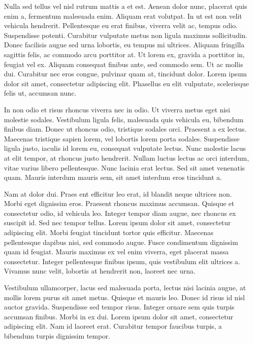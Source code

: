 \documentclass[
  12pt,
  a4paper,
]{book}
\begin{document}
Nulla sed tellus vel nisl rutrum mattis a et est. Aenean dolor nunc, placerat quis enim a, fermentum malesuada enim. Aliquam erat volutpat. In ut est non velit vehicula hendrerit. Pellentesque eu erat finibus, viverra velit ac, tempus odio. Suspendisse potenti. Curabitur vulputate metus non ligula maximus sollicitudin. Donec facilisis augue sed urna lobortis, eu tempus mi ultrices. Aliquam fringilla sagittis felis, ac commodo arcu porttitor at. Ut lorem ex, gravida a porttitor in, feugiat vel ex. Aliquam consequat finibus ante, sed commodo sem. Ut ac mollis dui. Curabitur nec eros congue, pulvinar quam at, tincidunt dolor. Lorem ipsum dolor sit amet, consectetur adipiscing elit. Phasellus eu elit vulputate, scelerisque felis ut, accumsan nunc.

In non odio et risus rhoncus viverra nec in odio. Ut viverra metus eget nisi molestie sodales. Vestibulum ligula felis, malesuada quis vehicula eu, bibendum finibus diam. Donec ut rhoncus odio, tristique sodales orci. Praesent a ex lectus. Maecenas tristique sapien lorem, vel lobortis lorem porta sodales. Suspendisse ligula justo, iaculis id lorem eu, consequat vulputate lectus. Nunc molestie lacus at elit tempor, at rhoncus justo hendrerit. Nullam luctus lectus ac orci interdum, vitae varius libero pellentesque. Nunc lacinia erat lectus. Sed sit amet venenatis quam. Mauris interdum mauris sem, sit amet interdum eros tincidunt a.

Nam at dolor dui. Praes ent efficitur leo erat, id blandit neque ultrices non. Morbi eget dignissim eros. Praesent rhoncus maximus accumsan. Quisque et consectetur odio, id vehicula leo. Integer tempor diam augue, nec rhoncus ex suscipit id. Sed nec tempor tellus. Lorem ipsum dolor sit amet, consectetur adipiscing elit. Morbi feugiat tincidunt tortor quis efficitur. Maecenas pellentesque dapibus nisi, sed commodo augue. Fusce condimentum dignissim quam id feugiat. Mauris maximus ex vel enim viverra, eget placerat massa consectetur. Integer pellentesque finibus ipsum, quis vestibulum elit ultrices a. Vivamus nunc velit, lobortis at hendrerit non, laoreet nec urna.

Vestibulum ullamcorper, lacus sed malesuada porta, lectus nisi lacinia augue, at mollis lorem purus sit amet metus. Quisque et mauris leo. Donec id risus id nisl auctor gravida. Suspendisse sed tempor risus. Integer ornare sem quis turpis accumsan finibus. Morbi in ex dui. Lorem ipsum dolor sit amet, consectetur adipiscing elit. Nam id laoreet erat. Curabitur tempor faucibus turpis, a bibendum turpis dignissim tempor.
\end{document}

